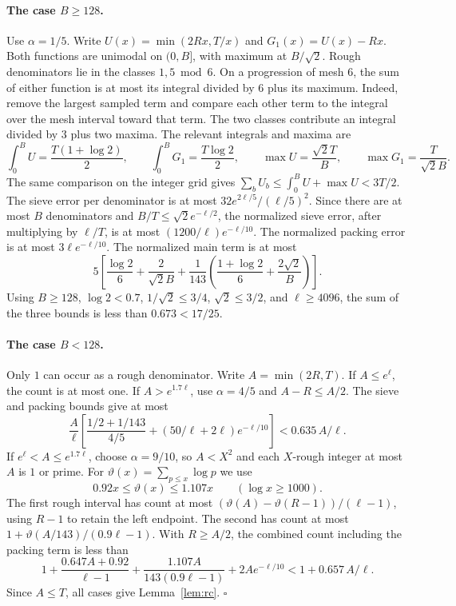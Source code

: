 \documentclass[11pt,a4paper]{article}
\begin{document}
\paragraph{The case \(B\ge128\).}
Use \(\alpha=1/5\). Write \(U(x)=\min(2Rx,T/x)\) and
\(G_1(x)=U(x)-Rx\). Both functions are unimodal on \((0,B]\),
with maximum at \(B/\sqrt2\). Rough denominators lie in the
classes \(1,5\bmod6\). On a progression of mesh \(6\), the
sum of either function is at most its integral divided by \(6\)
plus its maximum. Indeed, remove the largest sampled term and
compare each other term to the integral over the mesh interval
toward that term. The two classes contribute an integral divided
by \(3\) plus two maxima. The relevant integrals and maxima are
\[
 \int_0^B U=\frac{T(1+\log2)}2,\qquad
 \int_0^B G_1=\frac{T\log2}2,\qquad
 \max U=\frac{\sqrt2 T}{B},\qquad
 \max G_1=\frac T{\sqrt2 B}.
\]
The same comparison on the integer grid gives
\(\sum_b U_b\le\int_0^B U+\max U<3T/2\).
The sieve error per denominator is at most
\(32e^{2\ell/5}/(\ell/5)^2\). Since there are at most \(B\)
denominators and \(B/T\le\sqrt2e^{-\ell/2}\), the normalized
sieve error, after multiplying by \(\ell/T\), is at most
\((1200/\ell)e^{-\ell/10}\). The normalized packing error is at
most \(3\ell e^{-\ell/10}\).
The normalized main term is at most
\[
 5\left[\frac{\log2}{6}+\frac2{\sqrt2 B}
    +\frac1{143}\left(\frac{1+\log2}{6}+\frac{2\sqrt2}{B}\right)\right].
\]
Using \(B\ge128\), \(\log2<0.7\), \(1/\sqrt2\le3/4\),
\(\sqrt2\le3/2\), and \(\ell\ge4096\), the sum of the three
bounds is less than \(0.673<17/25\).

\paragraph{The case \(B<128\).}
Only \(1\) can occur as a rough denominator.
Write \(A=\min(2R,T)\). If \(A\le e^\ell\), the count is at most
one. If \(A>e^{1.7\ell}\), use \(\alpha=4/5\) and \(A-R\le A/2\).
The sieve and packing bounds give at most
\[
 \frac A\ell\left[\frac{1/2+1/143}{4/5}
       +(50/\ell+2\ell)e^{-\ell/10}\right]<0.635\,A/\ell.
\]
If \(e^\ell<A\le e^{1.7\ell}\), choose \(\alpha=9/10\), so
\(A<X^2\) and each \(X\)-rough integer at most \(A\) is \(1\) or
prime. For \(\vartheta(x)=\sum_{p\le x}\log p\) we use
\begin{equation}
 0.92x\le\vartheta(x)\le1.107x\qquad (\log x\ge1000).
 \label{eq:chebyshev}
\end{equation}
The first rough interval has count at most
\((\vartheta(A)-\vartheta(R-1))/(\ell-1)\), using \(R-1\) to
retain the left endpoint. The second has count at most
\(1+\vartheta(A/143)/(0.9\ell-1)\).
With \(R\ge A/2\), the combined count including the packing term is
less than
\[
 1+\frac{0.647 A+0.92}{\ell-1}
       +\frac{1.107 A}{143(0.9\ell-1)}
       +2Ae^{-\ell/10}
 <1+0.657\,A/\ell.
\]
Since \(A\le T\), all cases give Lemma~\ref{lem:rc}.
\hfill\(\square\)
\end{document}

